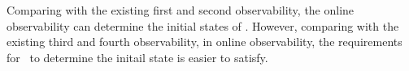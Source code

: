 Comparing with the existing first and second observability, the online observability can determine the initial states of \BCNs. However, comparing with the existing third and fourth observability, in online observability, the requirements for \BCNs\ to determine the initail state is easier to satisfy.  %

